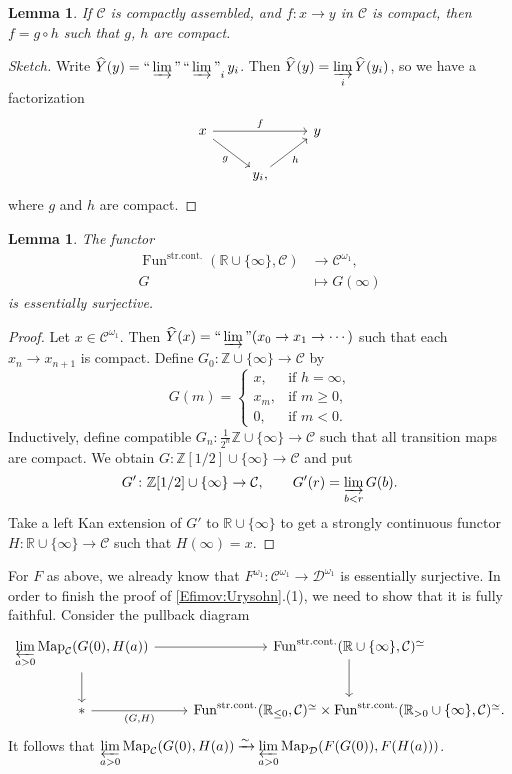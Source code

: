 \documentclass[draft]{amsart}
\newcommand{\ZZ}{\mathbb{Z}}
\newcommand{\RR}{\mathbb{R}}
\newcommand{\wh}[1]{\widehat{#1}}
\newcommand{\cat}[1]{\mathcal{#1}}
\newcommand{\isoto}{\mathbin{\xrightarrow{\sim}}}
\DeclareMathOperator{\Map}{Map}
\DeclareMathOperator{\Fun}{Fun}
\DeclareMathOperator*{\indinjlim}{\text{``}\varinjlim\text{''}} %
\newtheorem{lem}[thm]{Lemma}
\theoremstyle{definition}
\begin{document}
\begin{lem}
If $\cat C$ is compactly assembled, and $f\colon x\to y$ in $\cat C$ is compact, then $f = g\circ h$ such that $g$, $h$ are compact.
\end{lem}
\begin{proof}[Sketch]
Write $\wh{Y}(y)= \indinjlim\indinjlim_i y_i$. Then $\wh{Y}(y) = \varinjlim\limits_i \wh{Y}(y_i)$, so we have a factorization 
\[
\begin{tikzcd}
x \ar[rr,"f"] \ar[dr,"g"'] & & y \\
& y_i \ar[ur,"h"'],
\end{tikzcd}
\]
where $g$ and $h$ are compact.
\end{proof}

\begin{lem}
The functor
\begin{align*}
\Fun^{\mathrm{str.cont.}}(\RR\cup \{\infty\}, \cat C) &\to \cat C^{\omega_1}, \\
G &\mapsto G(\infty)
\end{align*}
is essentially surjective.
\end{lem}
\begin{proof}
Let $x \in \cat C^{\omega_1}$. Then $\wh{Y}(x) = \indinjlim (x_0\to x_1\to \dotsb)$ such that each $x_n \to x_{n+1}$ is compact. Define $G_0\colon \ZZ\cup \{\infty\} \to \cat C$ by
\[
G(m) = \begin{cases}
x, & \text{if $h=\infty$,}\\
x_m, & \text{if $m\ge0$,} \\
0, & \text{if $m<0$.}
\end{cases}
\]
Inductively, define compatible $G_n\colon \frac1{2^n}\ZZ\cup\{\infty\} \to \cat C$ such that all transition maps are compact. We obtain $G\colon \ZZ[1/2] \cup\{\infty\} \to \cat C$ and put
\[
G'\colon \ZZ[1/2] \cup\{\infty\} \to \cat C, \qquad G'(r) = \varinjlim\limits_{b<r} G(b).
\]
Take a left Kan extension of $G'$ to $\RR\cup\{\infty\}$ to get a strongly continuous functor $H\colon \RR\cup \{\infty\} \to \cat C$ such that $H(\infty) = x$.
\end{proof}

For $F$ as above, we already know that $F^{\omega_1}\colon \cat C^{\omega_1} \to \cat D^{\omega_1}$ is essentially surjective. In order to finish the proof of \cref{Efimov:Urysohn}.(1), we need to show that it is fully faithful. Consider the pullback diagram
\[
\begin{tikzcd}
\varprojlim\limits_{a>0} \Map_{\cat C}(G(0), H(a)) \ar[r] \ar[d] & \Fun^{\mathrm{str.cont.}} (\RR\cup \{\infty\}, \cat C)^{\simeq} \ar[d] \\
* \ar[r,"{(G,H)}"'] & \Fun^{\mathrm{str.cont.}}(\RR_{\le0}, \cat C)^{\simeq} \times \Fun^{\mathrm{str.cont.}}(\RR_{>0}\cup \{\infty\}, \cat C)^{\simeq}.
\end{tikzcd}
\]
It follows that $\varprojlim\limits_{a>0} \Map_{\cat C}(G(0), H(a)) \isoto \varprojlim\limits_{a>0} \Map_{\cat D}(F(G(0)), F(H(a)))$.
\end{document}
